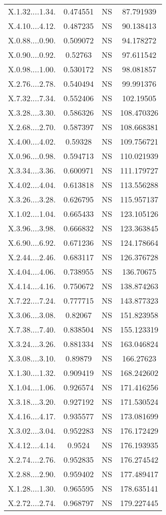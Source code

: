 \documentclass[]{article}
\begin{document}
\begin{longtable}{ c c c c }
X.1.32....1.34. & 0.474551 & NS & 87.791939\\
X.4.10....4.12. & 0.487235 & NS & 90.138413\\
X.0.88....0.90. & 0.509072 & NS & 94.178272\\
X.0.90....0.92. & 0.52763 & NS & 97.611542\\
X.0.98....1.00. & 0.530172 & NS & 98.081857\\
X.2.76....2.78. & 0.540494 & NS & 99.991376\\
X.7.32....7.34. & 0.552406 & NS & 102.19505\\
X.3.28....3.30. & 0.586326 & NS & 108.470326\\
X.2.68....2.70. & 0.587397 & NS & 108.668381\\
X.4.00....4.02. & 0.59328 & NS & 109.756721\\
X.0.96....0.98. & 0.594713 & NS & 110.021939\\
X.3.34....3.36. & 0.600971 & NS & 111.179727\\
X.4.02....4.04. & 0.613818 & NS & 113.556288\\
X.3.26....3.28. & 0.626795 & NS & 115.957137\\
X.1.02....1.04. & 0.665433 & NS & 123.105126\\
X.3.96....3.98. & 0.666832 & NS & 123.363845\\
X.6.90....6.92. & 0.671236 & NS & 124.178664\\
X.2.44....2.46. & 0.683117 & NS & 126.376728\\
X.4.04....4.06. & 0.738955 & NS & 136.70675\\
X.4.14....4.16. & 0.750672 & NS & 138.874263\\
X.7.22....7.24. & 0.777715 & NS & 143.877323\\
X.3.06....3.08. & 0.82067 & NS & 151.823958\\
X.7.38....7.40. & 0.838504 & NS & 155.123319\\
X.3.24....3.26. & 0.881334 & NS & 163.046824\\
X.3.08....3.10. & 0.89879 & NS & 166.27623\\
X.1.30....1.32. & 0.909419 & NS & 168.242602\\
X.1.04....1.06. & 0.926574 & NS & 171.416256\\
X.3.18....3.20. & 0.927192 & NS & 171.530524\\
X.4.16....4.17. & 0.935577 & NS & 173.081699\\
X.3.02....3.04. & 0.952283 & NS & 176.172429\\
X.4.12....4.14. & 0.9524 & NS & 176.193935\\
X.2.74....2.76. & 0.952835 & NS & 176.274542\\
X.2.88....2.90. & 0.959402 & NS & 177.489417\\
X.1.28....1.30. & 0.965595 & NS & 178.635141\\
X.2.72....2.74. & 0.968797 & NS & 179.227445   
    \end{longtable}
\end{document}
